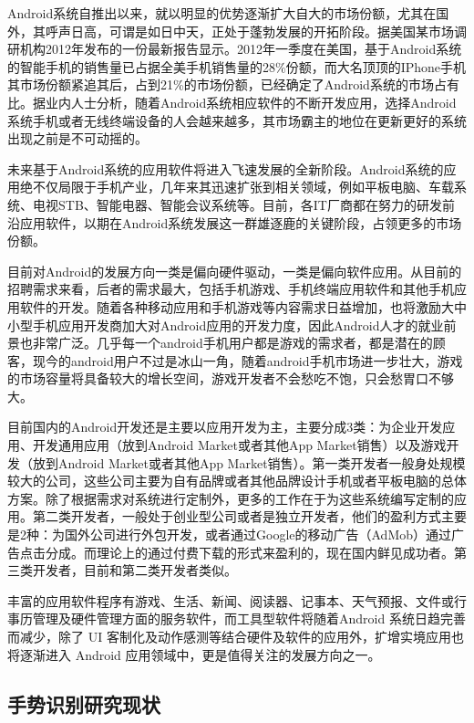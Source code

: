 \documentclass{XDBAthesis}
\begin{document}
Android系统自推出以来，就以明显的优势逐渐扩大自大的市场份额，尤其在国外，其呼声日高，可谓是如日中天，正处于蓬勃发展的开拓阶段。据美国某市场调研机构2012年发布的一份最新报告显示。2012年一季度在美国，基于Android系统的智能手机的销售量已占据全美手机销售量的28\%份额，而大名顶顶的IPhone手机其市场份额紧追其后，占到21\%的市场份额，已经确定了Android系统的市场占有比。据业内人士分析，随着Android系统相应软件的不断开发应用，选择Android系统手机或者无线终端设备的人会越来越多，其市场霸主的地位在更新更好的系统出现之前是不可动摇的。

  未来基于Android系统的应用软件将进入飞速发展的全新阶段。Android系统的应用绝不仅局限于手机产业，几年来其迅速扩张到相关领域，例如平板电脑、车载系统、电视STB、智能电器、智能会议系统等。目前，各IT厂商都在努力的研发前沿应用软件，以期在Android系统发展这一群雄逐鹿的关键阶段，占领更多的市场份额。

目前对Android的发展方向一类是偏向硬件驱动，一类是偏向软件应用。从目前的招聘需求来看，后者的需求最大，包括手机游戏、手机终端应用软件和其他手机应用软件的开发。随着各种移动应用和手机游戏等内容需求日益增加，也将激励大中小型手机应用开发商加大对Android应用的开发力度，因此Android人才的就业前景也非常广泛。几乎每一个android手机用户都是游戏的需求者，都是潜在的顾客，现今的android用户不过是冰山一角，随着android手机市场进一步壮大，游戏的市场容量将具备较大的增长空间，游戏开发者不会愁吃不饱，只会愁胃口不够大。

目前国内的Android开发还是主要以应用开发为主，主要分成3类：为企业开发应用、开发通用应用（放到Android Market或者其他App Market销售）以及游戏开发（放到Android Market或者其他App Market销售）。第一类开发者一般身处规模较大的公司，这些公司主要为自有品牌或者其他品牌设计手机或者平板电脑的总体方案。除了根据需求对系统进行定制外，更多的工作在于为这些系统编写定制的应用。第二类开发者，一般处于创业型公司或者是独立开发者，他们的盈利方式主要是2种：为国外公司进行外包开发，或者通过Google的移动广告（AdMob）通过广告点击分成。而理论上的通过付费下载的形式来盈利的，现在国内鲜见成功者。第三类开发者，目前和第二类开发者类似。

丰富的应用软件程序有游戏、生活、新闻、阅读器、记事本、天气预报、文件或行事历管理及硬件管理方面的服务软件，而工具型软件将随着Android 系统日趋完善而减少，除了 UI 客制化及动作感测等结合硬件及软件的应用外，扩增实境应用也将逐渐进入 Android 应用领域中，更是值得关注的发展方向之一。

\subsection{手势识别研究现状}
\end{document}
